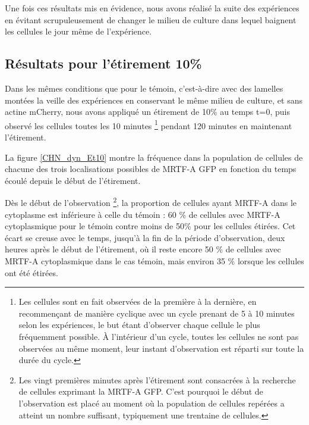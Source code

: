 Une fois ces résultats mis en évidence, nous avons réalisé la suite des expériences en évitant scrupuleusement de changer le milieu de culture dans lequel baignent les cellules le jour même de l'expérience. 




\subsection{Résultats pour l'étirement 10\%}

Dans les mêmes conditions que pour le témoin, c'est-à-dire avec des lamelles montées la veille des expériences en conservant le même milieu de culture, et sans actine mCherry, nous avons appliqué un étirement de 10\% au temps t=0, puis observé les cellules toutes les 10 minutes \footnote{Les cellules sont en fait observées de la première à la dernière, en recommençant de manière cyclique avec un cycle prenant de 5 à 10 minutes selon les expériences, le but étant d'observer chaque cellule le plus fréquemment possible. À l'intérieur d'un cycle, toutes les cellules ne sont pas observées au même moment, leur instant d'observation est réparti sur toute la durée du cycle. } pendant 120 minutes en maintenant l'étirement. 

La figure \ref{CHN_dyn_Et10} montre la fréquence dans la population de cellules de chacune des trois localisations possibles de MRTF-A GFP en fonction du temps écoulé depuis le début de l'étirement. 
 
Dès le début de l'observation \footnote{Les vingt premières minutes après l'étirement sont consacrées à la recherche de cellules exprimant la MRTF-A GFP. C'est pourquoi le début de l'observation est placé au moment où la population de cellules repérées a atteint un nombre suffisant, typiquement une trentaine de cellules.}, la proportion de cellules ayant MRTF-A dans le cytoplasme est inférieure à celle du témoin : 60 \% de cellules avec MRTF-A cytoplasmique pour le témoin contre moins de 50\% pour les cellules étirées. Cet écart se creuse avec le temps, jusqu'à la fin de la période d'observation, deux heures après le début de l'étirement, où il reste encore 50 \% de cellules avec MRTF-A cytoplasmique dans le cas témoin, mais environ 35 \% lorsque les cellules ont été étirées. 

